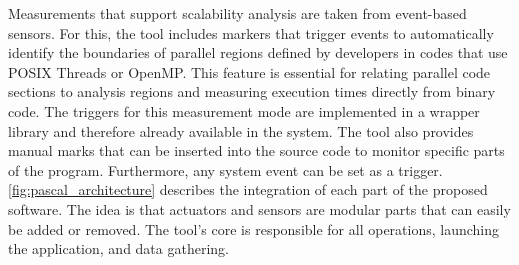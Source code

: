 Measurements that support scalability analysis are taken from event-based sensors. For this, the tool includes markers that trigger events to automatically identify the boundaries of parallel regions defined by developers in codes that use POSIX Threads or OpenMP.
This feature is essential for relating parallel code sections to analysis regions and measuring execution times directly from binary code. The triggers for this measurement mode are implemented in a wrapper library and therefore already available in the system. The tool also provides manual marks that can be inserted into the source code to monitor specific parts of the program. Furthermore, any system event can be set as a trigger.
\cref{fig:pascal_architecture} describes the integration of each part of the proposed software. The idea is that actuators and sensors are modular parts that can easily be added or removed. The tool's core is responsible for all operations, launching the application, and data gathering.

